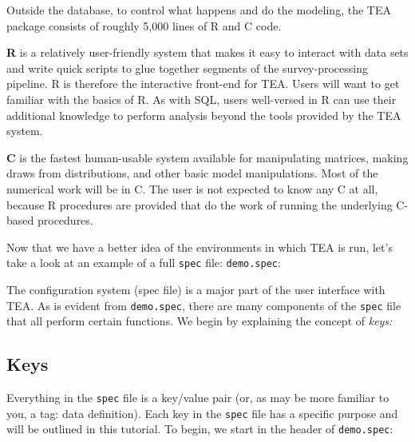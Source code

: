 \documentclass{article}
\begin{document}
Outside the database, to control what happens and
do the modeling, the TEA package consists of roughly 5,000 lines of R and C code.

{\bf R} is a relatively user-friendly system that makes it easy to interact with data
sets and write quick scripts to glue together segments of the survey-processing pipeline.
R is therefore the interactive front-end for TEA. Users will want to get familiar with the basics of
R.  As with SQL, users well-versed in R can use their additional knowledge to perform
analysis beyond the tools provided by the TEA system.

{\bf C} is the fastest human-usable system available for manipulating matrices, making
draws from distributions, and other basic model manipulations. Most of the numerical
work will be in C. The user is not expected to know any C at all, because R procedures
are provided that do the work of running the underlying C-based procedures.

Now that we have a better idea of the environments in which TEA is run, let's take a look  
at an example of a full {\tt spec} file: {\tt demo.spec}:

The configuration system (spec file) is a major part of the user interface with TEA. As is evident 
from {\tt demo.spec}, there are many components of the {\tt spec} file that all perform certain functions. 
We begin by explaining the concept of \textit{keys:}

\subsection{Keys}
Everything in the {\tt spec} file is a key/value pair (or, as may be more familiar to 
you, a tag: data definition). Each key in the {\tt spec} file has a specific purpose and 
will be outlined in this tutorial.
To begin, we start in the header of {\tt demo.spec}:
\end{document}
